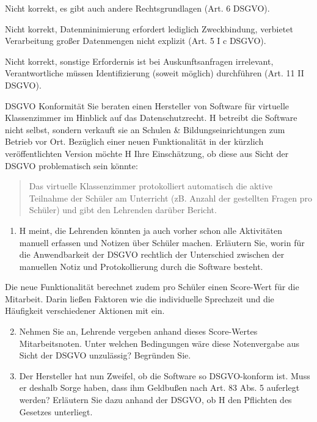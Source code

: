 \documentclass{article}
\begin{document}
\begin{solutions}
  \item Nicht korrekt, es gibt auch andere Rechtsgrundlagen (Art. 6 DSGVO).
  \item Nicht korrekt, Datenminimierung erfordert lediglich Zweckbindung, verbietet Verarbeitung großer Datenmengen nicht explizit (Art. 5 I c DSGVO).
  \item Nicht korrekt, sonstige Erfordernis ist bei Auskunftsanfragen irrelevant, Verantwortliche müssen Identifizierung (soweit möglich) durchführen (Art. 11 II DSGVO).
\end{solutions}


\begin{exercise}{DSGVO Konformität}
  Sie beraten einen Hersteller von Software für virtuelle Klassenzimmer im Hinblick auf das Datenschutzrecht. H betreibt die Software nicht selbst, sondern verkauft sie an Schulen \& Bildungseinrichtungen zum Betrieb vor Ort. Bezüglich einer neuen Funktionalität in der kürzlich veröffentlichten Version möchte H Ihre Einschätzung, ob diese aus Sicht der DSGVO problematisch sein könnte:
  \begin{quote}
    Das virtuelle Klassenzimmer protokolliert automatisch die aktive Teilnahme der Schüler am Unterricht (zB. Anzahl der gestellten Fragen pro Schüler) und gibt den Lehrenden darüber Bericht.
  \end{quote}

  \begin{enumerate}
    \item H meint, die Lehrenden könnten ja auch vorher schon alle Aktivitäten manuell erfassen und Notizen über Schüler machen. Erläutern Sie, worin für die Anwendbarkeit der DSGVO rechtlich der Unterschied zwischen der manuellen Notiz und Protokollierung durch die Software besteht.
  \end{enumerate}

  Die neue Funktionalität berechnet zudem pro Schüler einen Score-Wert für die Mitarbeit. Darin ließen Faktoren wie die individuelle Sprechzeit und die Häufigkeit verschiedener Aktionen mit ein.

  \begin{enumerate}
    \setcounter{enumi}{1}
    \item Nehmen Sie an, Lehrende vergeben anhand dieses Score-Wertes Mitarbeitsnoten. Unter welchen Bedingungen wäre diese Notenvergabe aus Sicht der DSGVO unzulässig? Begründen Sie.
    \item Der Hersteller hat nun Zweifel, ob die Software so DSGVO-konform ist. Muss er deshalb Sorge haben, dass ihm Geldbußen nach Art. 83 Abs. 5 auferlegt werden? Erläutern Sie dazu anhand der DSGVO, ob H den Pflichten des Gesetzes unterliegt.
  \end{enumerate}
\end{exercise}
\end{document}
